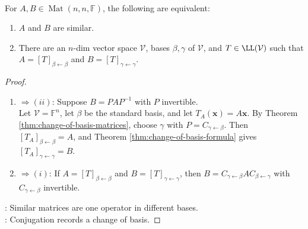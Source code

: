 \begin{corollary} \label{cor:similar-iff-same-linear-operator} \\
For $A,B\in\operatorname{Mat}(n,n,\mathbb{F})$, the following are equivalent:
\begin{enumerate}[label=(\roman*)]
\setlength{\itemsep}{0pt}
\item $A$ and $B$ are similar.
\item There are an $n$-dim vector space $\mathcal{V}$, bases $\beta,\gamma$ of $\mathcal{V}$, and $T\in\LL(\mathcal{V})$ such that $A=[T]_{\beta \leftarrow \beta}$ and $B=[T]_{\gamma \leftarrow \gamma}$.
\end{enumerate}
\begin{proof}
\begin{enumerate}[label=(\roman)*.]
\setlength{\itemsep}{0pt}
\item[$(i)$] $\Rightarrow (ii)$: Suppose $B=PAP^{-1}$ with $P$ invertible.\\
Let $\mathcal{V}=\mathbb{F}^n$, let $\beta$ be the standard basis, and let $T_A(\mathbf{x})=A\mathbf{x}$. By Theorem \ref{thm:change-of-basis-matrices}, choose $\gamma$ with $P=C_{\gamma \leftarrow \beta}$. Then $[T_A]_{\beta \leftarrow \beta}=A$, and Theorem \ref{thm:change-of-basis-formula} gives $[T_A]_{\gamma \leftarrow \gamma}=B$.
\item[$(ii)$] $\Rightarrow (i)$: If $A=[T]_{\beta \leftarrow \beta}$ and $B=[T]_{\gamma \leftarrow \gamma}$, then $B=C_{\gamma \leftarrow \beta}AC_{\beta \leftarrow \gamma}$ with $C_{\gamma \leftarrow \beta}$ invertible.
\end{enumerate}
: Similar matrices are one operator in different bases.\\
: Conjugation records a change of basis.
\end{proof}
\end{corollary}

